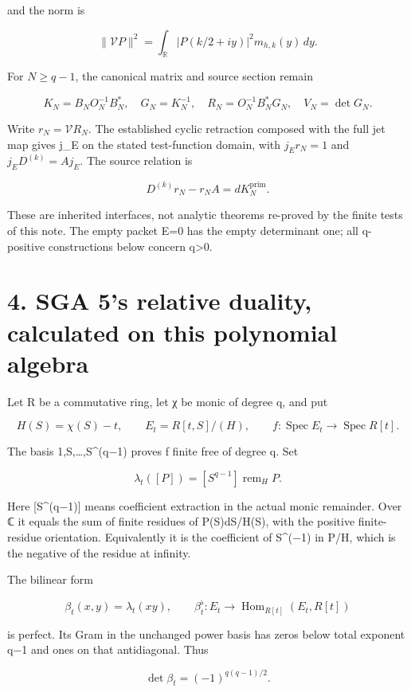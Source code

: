 \documentclass[
  11pt,
]{article}
\begin{document}
and the norm is

\[
\|\mathcal VP\|^2
 =\int_{\mathbb R}|P(k/2+iy)|^2m_{h,k}(y)\,dy.
\tag{9}
\]

For \(N\ge q-1\), the canonical matrix and source section remain

\[
K_N=B_NO_N^{-1}B_N^*,\quad G_N=K_N^{-1},\quad
R_N=O_N^{-1}B_N^*G_N,\quad V_N=\det G_N.
\tag{10}
\]

Write \(r_N=\mathcal V R_N\). The established cyclic retraction composed
with the full jet map gives j\_E on the stated test-function domain,
with \(j_Er_N=1\) and \(j_ED^{(k)}=Aj_E\). The source relation is

\[
D^{(k)}r_N-r_NA=dK_N^{\mathrm{prim}}.
\tag{11}
\]

These are inherited interfaces, not analytic theorems re-proved by the
finite tests of this note. The empty packet E=0 has the empty
determinant one; all q-positive constructions below concern
q\textgreater0.

\section{4. SGA 5's relative duality, calculated on this polynomial
algebra}\label{sga-5s-relative-duality-calculated-on-this-polynomial-algebra}

Let R be a commutative ring, let χ be monic of degree q, and put

\[
H(S)=\chi(S)-t,\qquad E_t=R[t,S]/(H),\qquad
f:\operatorname{Spec}E_t\longrightarrow\operatorname{Spec}R[t].
\tag{12}
\]

The basis 1,S,\ldots,S\^{}(q−1) proves f finite free of degree q. Set

\[
\lambda_t([P])=[S^{q-1}]\operatorname{rem}_{H}P.
\tag{13}
\]

Here {[}S\^{}(q−1){]} means coefficient extraction in the actual monic
remainder. Over ℂ it equals the sum of finite residues of P(S)dS/H(S),
with the positive finite-residue orientation. Equivalently it is the
coefficient of S\^{}(−1) in P/H, which is the negative of the residue at
infinity.

The bilinear form

\[
\beta_t(x,y)=\lambda_t(xy),\qquad
\beta_t^\flat:E_t\longrightarrow\operatorname{Hom}_{R[t]}(E_t,R[t])
\tag{14}
\]

is perfect. Its Gram in the unchanged power basis has zeros below total
exponent q−1 and ones on that antidiagonal. Thus

\[
\det\beta_t=(-1)^{q(q-1)/2}.
\tag{15}
\]
\end{document}
